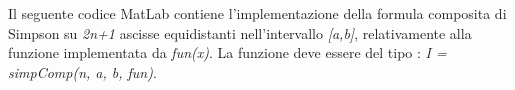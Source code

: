 Il seguente codice MatLab contiene l'implementazione della formula composita di Simpson su \textit{2n+1} ascisse equidistanti nell'intervallo \textit{[a,b]}, relativamente alla funzione implementata da \textit{fun(x)}. La funzione deve essere del tipo : \textit{I = simpComp(n, a, b, fun)}.\\\

